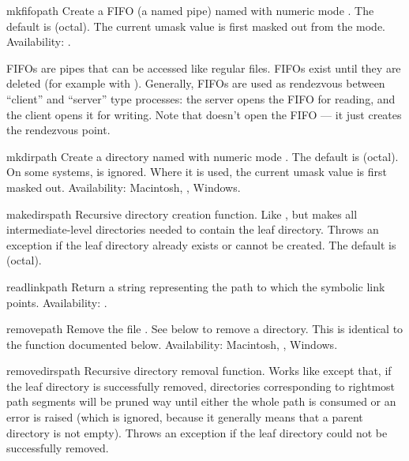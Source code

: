 \begin{funcdesc}{mkfifo}{path}
Create a FIFO (a named pipe) named  with numeric mode
.  The default  is  (octal).  The current
umask value is first masked out from the mode.
Availability: \UNIX{}.

FIFOs are pipes that can be accessed like regular files.  FIFOs exist
until they are deleted (for example with ).
Generally, FIFOs are used as rendezvous between ``client'' and
``server'' type processes: the server opens the FIFO for reading, and
the client opens it for writing.  Note that 
doesn't open the FIFO --- it just creates the rendezvous point.
\end{funcdesc}

\begin{funcdesc}{mkdir}{path}
Create a directory named  with numeric mode .
The default  is  (octal).  On some systems,
 is ignored.  Where it is used, the current umask value is
first masked out.
Availability: Macintosh, \UNIX{}, Windows.
\end{funcdesc}

\begin{funcdesc}{makedirs}{path}
Recursive directory creation function.  Like ,
but makes all intermediate-level directories needed to contain the
leaf directory.  Throws an  exception if the leaf
directory already exists or cannot be created.  The default 
is  (octal).
\end{funcdesc}

\begin{funcdesc}{readlink}{path}
Return a string representing the path to which the symbolic link
points.
Availability: \UNIX{}.
\end{funcdesc}

\begin{funcdesc}{remove}{path}
Remove the file .  See  below to remove a
directory.  This is identical to the  function
documented below.
Availability: Macintosh, \UNIX{}, Windows.
\end{funcdesc}

\begin{funcdesc}{removedirs}{path}
Recursive directory removal function.  Works like
 except that, if the leaf directory is
successfully removed, directories corresponding to rightmost path
segments will be pruned way until either the whole path is consumed or
an error is raised (which is ignored, because it generally means that
a parent directory is not empty).  Throws an 
exception if the leaf directory could not be successfully removed.
\end{funcdesc}

